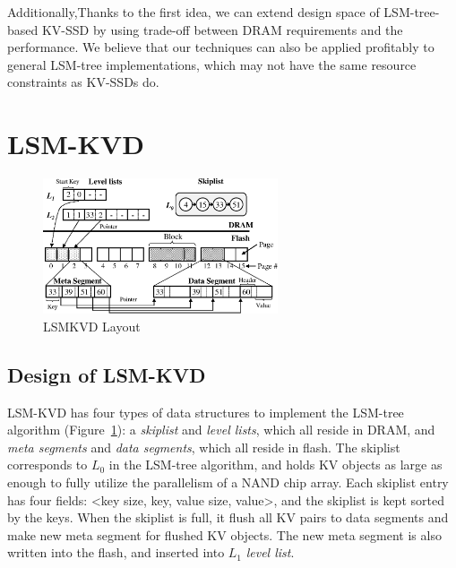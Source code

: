 \documentclass{abstract_hutech}
\newcommand{\ours}{LSM-KVD}
\begin{document}
Additionally,Thanks to the first idea, we can extend design space of LSM-tree-based KV-SSD by using trade-off between DRAM requirements and the performance.
We believe that our techniques can also be applied profitably to general LSM-tree implementations, which may not have the same resource constraints as KV-SSDs do.

\vspace{-10pt}
\section{\ours{}}\vspace{-20pt}
\begin{figure}[h]
	\centering
	\includegraphics[height=4.0cm]{fig/fig3.eps}
	\caption{LSMKVD Layout}
	\label{fig:overall}\vspace{-20pt}
\end{figure}
\subsection{Design of \ours{}}\vspace{-5pt}
\ours{} has four types of data structures to implement the LSM-tree algorithm
(Figure~\ref{fig:overall}): a \textit{skiplist} and \textit{level lists}, which
all reside in DRAM, and  \textit{meta segments} and \textit{data segments},
which all reside in flash. The skiplist corresponds to $L_0$ in the LSM-tree algorithm, and holds KV
objects as large as enough to fully utilize the parallelism of a NAND chip
array.  Each skiplist entry has four fields: <key size, key, value size,
value>, and the skiplist is kept sorted by the keys. 
When the skiplist is full, it flush all KV pairs to data segments and make new meta segment for flushed KV objects.
The new meta segment is also written into the flash, and inserted into $L_1$ \textit{level list}.
\end{document}
